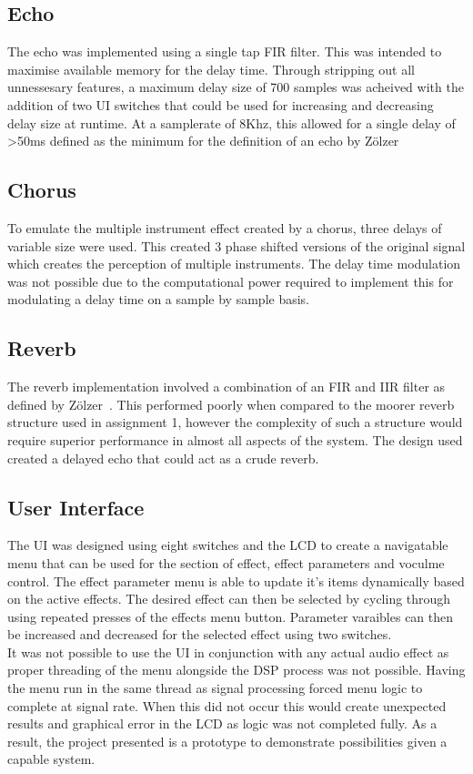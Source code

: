 \documentclass{scrartcl}
\begin{document}
    \subsection{Echo}
    The echo was implemented using a single tap FIR filter. This was intended
    to maximise available memory for the delay time. Through stripping out all
    unnessesary features, a maximum delay size of 700 samples was acheived with
    the addition of two UI switches that could be used for increasing and
    decreasing delay size at runtime.
    At a samplerate of 8Khz, this allowed for a single delay of \textgreater50ms defined
    as the minimum for the definition of an echo
    by Z{\"o}lzer~\citeyearpar[p.]{zolzer2011dafx}

    \subsection{Chorus}
    To emulate the multiple instrument effect created by a chorus, three delays
    of variable size were used. This created 3 phase shifted versions of the
    original signal which creates the perception of multiple instruments. The
    delay time modulation was not possible due to the computational power
    required to implement this for modulating a delay time on a sample by
    sample basis.

    \subsection{Reverb}
    The reverb implementation involved a combination of an FIR and IIR filter
    as defined by Z{\"o}lzer~\citeyearpar[p.]{zolzer2011dafx}. This performed
    poorly when compared to the moorer reverb structure used in assignment 1,
    however the complexity of such a structure would require superior
    performance in almost all aspects of the system.
    The design used created a delayed echo that could act as a crude reverb.

    \subsection{User Interface}
    The UI was designed using eight switches and the LCD to create a
    navigatable menu that can be used for the section of effect, effect
    parameters and voculme control. The effect parameter menu is able to update
    it's items dynamically based on the active effects. The desired effect can
    then be selected by cycling through using repeated presses of the effects
    menu button. Parameter varaibles can then be increased and decreased for
    the selected effect using two switches.\\
    It was not possible to use the UI in conjunction with any actual audio
    effect as proper threading of the menu alongside the DSP process was not
    possible. Having the menu run in the same thread as signal processing
    forced menu logic to complete at signal rate. When this did not occur this
    would create unexpected results and graphical error in the LCD as logic was
    not completed fully. As a result, the project presented is a prototype to
    demonstrate possibilities given a capable system.
\end{document}
